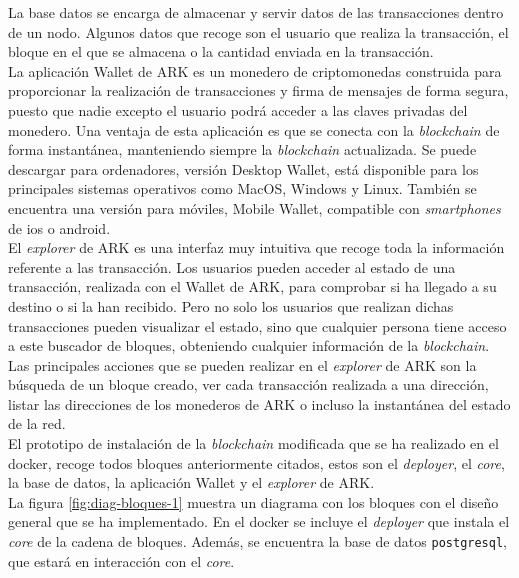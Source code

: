 \newpage
La base datos se encarga de almacenar y servir datos de las transacciones dentro de un nodo\cite{BD-ARK}. Algunos datos que recoge son el usuario que realiza la transacción, el bloque en el que se almacena o la cantidad enviada en la transacción.\\

La aplicación Wallet de ARK \cite{wallet} es un monedero de criptomonedas construida para proporcionar la realización de transacciones y firma de mensajes de forma segura, puesto que nadie excepto el usuario podrá acceder a las claves privadas del monedero. Una ventaja de esta aplicación  es que se conecta con la \textit{blockchain} de forma instantánea, manteniendo siempre la \textit{blockchain} actualizada. Se puede descargar para ordenadores, versión Desktop Wallet, está disponible para los principales sistemas operativos como MacOS, Windows y Linux. También se encuentra una versión para móviles, Mobile Wallet, compatible con \textit{smartphones} de \acrshort{ios} o android.\\

El \textit{explorer} de ARK \cite{explorer} es una interfaz muy intuitiva que recoge toda la información referente a las transacción. Los usuarios pueden acceder al estado de una transacción, realizada con el Wallet de ARK, para comprobar si ha llegado a su destino o si la han recibido. Pero no solo los usuarios que realizan dichas transacciones pueden visualizar el estado, sino que cualquier persona tiene acceso a este buscador de bloques, obteniendo cualquier información de la \textit{blockchain}. Las principales acciones que se pueden realizar en el \textit{explorer} de ARK son la búsqueda de un bloque creado, ver cada transacción realizada a una dirección, listar las direcciones de los monederos de ARK o incluso la instantánea del estado de la red.\\

El prototipo de instalación de la \textit{blockchain} modificada que se ha realizado en el docker, recoge todos bloques anteriormente citados, estos son el \textit{deployer}, el \textit{core}, la base de datos, la aplicación Wallet y el \textit{explorer} de ARK.\\

La figura \ref{fig:diag-bloques-1} muestra un diagrama con los bloques con el diseño general que se ha implementado. En el docker se incluye el \textit{deployer} que instala el \textit{core} de la cadena de bloques. Además, se encuentra la base de datos \texttt{postgresql}, que estará en interacción con el \textit{core}.\\

